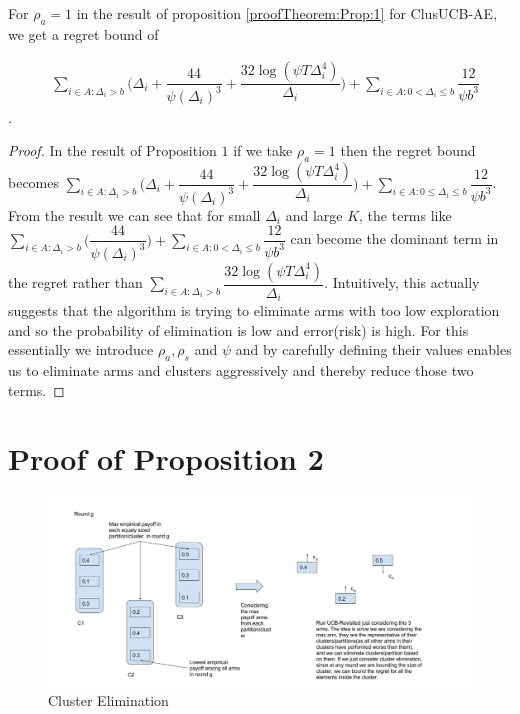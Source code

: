 
\begin{corollary}
\label{App:Proof:Corollary:3}
For $\rho_{a}=1$ in the result of proposition \ref{proofTheorem:Prop:1} for ClusUCB-AE, we get a regret bound of 

 \begin{align*}
 &\sum\limits_{i\in A:\Delta_{i} > b}\bigg(\Delta_{i} + \dfrac{44}{\psi(\Delta_{i})^{3}} + \dfrac{32\log{(\psi T\Delta_{i}^{4})}}{\Delta_{i}}\bigg) + \sum\limits_{i\in A:0< \Delta_{i}\leq b}\dfrac{12}{\psi b^{3}}
 \end{align*}.
\end{corollary}


\begin{proof}
In the result of Proposition $1$ if we take $\rho_{a}=1$ then the regret bound becomes $ \sum\limits_{i\in A:\Delta_{i} > b}\bigg(\Delta_{i} + \dfrac{44}{\psi(\Delta_{i})^{3}} + \dfrac{32\log{(\psi T\Delta_{i}^{4})}}{\Delta_{i}}\bigg) + \sum\limits_{i\in A:0\leq\Delta_{i}\leq b}\dfrac{12}{\psi b^{3}}$. From the result we can see that for small $\Delta_{i}$ and large $K$, the terms like $ \sum\limits_{i\in A:\Delta_{i} > b}\bigg(\dfrac{44}{\psi(\Delta_{i})^{3}}\bigg) + \sum\limits_{i\in A:0 < \Delta_{i}\leq b}\dfrac{12}{\psi b^{3}}$ can become the dominant term in the regret rather than $\sum\limits_{i\in A:\Delta_{i} > b}\dfrac{32\log{(\psi T\Delta_{i}^{4})}}{\Delta_{i}}$. Intuitively, this actually suggests that the algorithm is trying to eliminate arms with too low exploration and so the probability of elimination is low and error(risk) is high. For this essentially we introduce $\rho_{a},\rho_{s}$ and $\psi$ and by carefully defining their values enables us to eliminate arms and clusters aggressively and thereby reduce those two terms. 
\end{proof}

\section{Proof of Proposition 2}
\label{App:B}

\begin{figure}
\includegraphics[scale=0.3]{img/diagCluster.jpg}
\caption{Cluster Elimination}
\label{Fig:ClusFig}
\end{figure}

